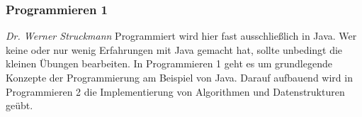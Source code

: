 \subsubsection{Programmieren 1}
	\textit{Dr. Werner Struckmann}
	Programmiert wird hier fast ausschließlich in Java. Wer keine oder nur wenig Erfahrungen mit Java gemacht hat, sollte unbedingt die kleinen Übungen bearbeiten.
	In Programmieren 1 geht es um grundlegende Konzepte der Programmierung am Beispiel von Java. Darauf aufbauend wird in Programmieren 2 die Implementierung von Algorithmen und Datenstrukturen geübt. 